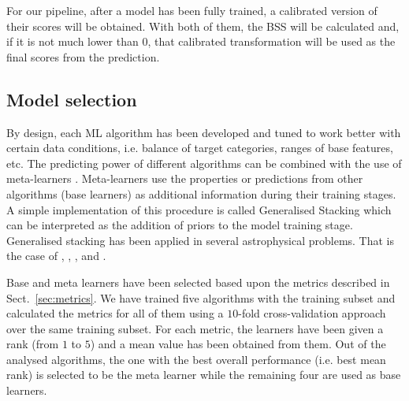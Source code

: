 \documentclass{aa}
\begin{document}
For our pipeline, after a model has been fully trained, a calibrated version of their scores will be obtained. With both of them, the BSS will be calculated and, if it is not much lower than $0$, that calibrated transformation will be used as the final scores from the prediction.

\subsection{Model selection}\label{sec:model_selection}

By design, each ML algorithm has been developed and tuned to work better with certain data conditions, i.e. balance of target categories, ranges of base features, etc. 
The predicting power of different algorithms can be combined with the use of meta-learners \citep{Vanschoren2019}. Meta-learners use the properties or predictions from other algorithms (base learners) as additional information during their training stages. A simple implementation of this procedure is called Generalised Stacking \citep{WOLPERT1992241} which can be interpreted
as the addition of priors to the model training stage. Generalised stacking has been applied in several astrophysical problems. That is the case of \citet{2016MNRAS.460.3152Z}, \citet{2022arXiv220913074H}, \citet{2022A&A...666A..87C}, and \citet{2022arXiv220614944E}.

Base and meta learners have been selected based upon the metrics described in Sect.~\ref{sec:metrics}. We have trained five algorithms with the training subset and calculated the metrics for all of them using a $10$-fold cross-validation approach \citep[e.g.][]{https://doi.org/10.1111/j.2517-6161.1974.tb00994.x, doi:10.1080/00401706.1974.10489157} over the same training subset. For each metric, the learners have been given a rank (from $1$ to $5$) and a mean value has been obtained from them. Out of the analysed algorithms, the one with the best overall performance (i.e. best mean rank) is selected to be the meta learner while the remaining four are used as base learners.
\end{document}

